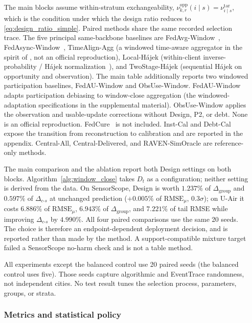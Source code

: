 \documentclass[letterpaper,journal]{IEEEtran}
\begin{document}
The main blocks assume within-stratum exchangeability,
$\nu^{\mathrm{opp}}_{k,r}(i\mid s)=\nu^{\mathrm{tar}}_{i\mid s}$, which is the
condition under which the design ratio reduces to
\eqref{eq:design_ratio_simple}.  Paired methods share the same recorded selection trace.
The five principal same-backbone baselines are
FedAvg-Window~\cite{mcmahan2017communication},
FedAsync-Window~\cite{xie2019asynchronous},
TimeAlign-Agg (a windowed time-aware aggregator in the spirit of
\cite{wang2026federated}, not an official reproduction),
Local-H\'ajek (within-client inverse-probability / H\'ajek
normalization~\cite{horvitz1952generalization,hajek1971comment}), and
TwoStage-H\'ajek (sequential H\'ajek on opportunity and
observation).  The main table additionally
reports two windowed participation baselines, FedAU-Window and
ObsUse-Window.  FedAU-Window adapts participation debiasing
\cite{wang2024lightweight} to window-close aggregation
(the windowed-adaptation specifications in the supplemental material).
ObsUse-Window applies the observation and usable-update
corrections without Design, P2, or debt.  None is an official
reproduction.  FedCure~\cite{chen2026fedcure} is not included.  Inst-Cal and Debt-Cal
expose the transition from reconstruction to calibration and are
reported in the appendix.  Central-All, Central-Delivered, and
RAVEN-SimOracle are reference-only methods.

The main comparison and the ablation report both Design settings on both
blocks.  Algorithm~\ref{alg:window_close} takes $D_t$ as a configuration;
neither setting is derived from the data.  On SensorScope, Design is worth
$1.237\%$ of $\Delta_{\mathrm{group}}$ and $0.597\%$ of
$\Delta_{c\text{-}s}$ at unchanged prediction ($+0.005\%$ of
$\mathrm{RMSE}_{\mu}$, $0.3\sigma$); on U-Air it costs $6.886\%$ of
$\mathrm{RMSE}_{\mu}$, $6.943\%$ of $\Delta_{\mathrm{group}}$, and $7.221\%$
of tail RMSE while improving $\Delta_{c\text{-}s}$ by $4.990\%$.  All four
paired comparisons use the same 20 seeds.  The choice is therefore an
endpoint-dependent deployment decision, and is reported rather than made by
the method.  A support-compatible mixture target failed a
SensorScope no-harm check and is not a table method.

All experiments except the balanced control use 20 paired seeds (the balanced control uses five).  Those seeds capture
algorithmic and EventTrace randomness, not independent cities.  No test
result tunes the selection process, parameters, groups, or strata.

\subsubsection{Metrics and statistical policy}
\end{document}
